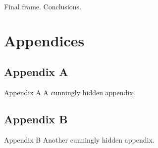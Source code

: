 \documentclass[compress,ignorenonframetext]{beamer}
\begin{document}
\begin{frame}
Final frame. Conclusions.
%
\setcounter{finalframe}{\value{framenumber}}
\end{frame}

\appendix

\section{Appendices}
\subsection{Appendix A}
\begin{frame}[noframenumbering]{Appendix A}
A cunningly hidden appendix.
\end{frame}


\subsection{Appendix B}
\begin{frame}[noframenumbering]{Appendix B}
%
Another cunningly hidden appendix.
%
\setcounter{framenumber}{\value{finalframe}} %
\end{frame}
\end{document}
